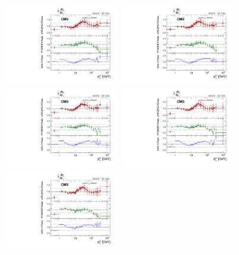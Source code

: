 \begin{figure}
	\centering
	\includegraphics[width=0.45\textwidth]{figures/zpt/zll_double_ratio_normrap0.pdf}
        \includegraphics[width=0.45\textwidth]{figures/zpt/zll_double_ratio_normrap1.pdf}
        \includegraphics[width=0.45\textwidth]{figures/zpt/zll_double_ratio_normrap2.pdf}
        \includegraphics[width=0.45\textwidth]{figures/zpt/zll_double_ratio_normrap3.pdf}
        \includegraphics[width=0.45\textwidth]{figures/zpt/zll_double_ratio_normrap4.pdf}

\end{figure}

